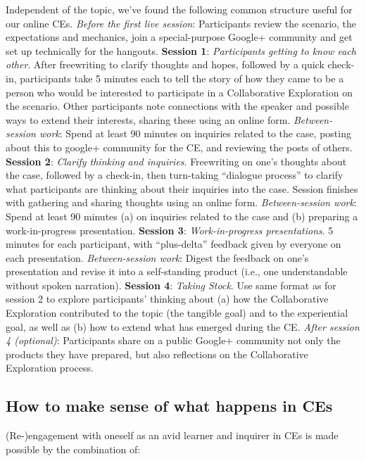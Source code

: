 Independent of the topic, we've found the following common structure
useful for our online CEs. \emph{Before the first live session}:
Participants review the scenario, the expectations and mechanics, join a
special-purpose Google+ community and get set up technically for the
hangouts. \textbf{Session 1}: \emph{Participants getting to know each
other}. After freewriting to clarify thoughts and hopes, followed by a
quick check-in, participants take 5 minutes each to tell the story of
how they came to be a person who would be interested to participate in a
Collaborative Exploration on the scenario. Other participants note
connections with the speaker and possible ways to extend their
interests, sharing these using an online form. \emph{Between-session
work}: Spend at least 90 minutes on inquiries related to the case,
posting about this to google+ community for the CE, and reviewing the
posts of others. \textbf{Session 2}: \emph{Clarify thinking and
inquiries}. Freewriting on one's thoughts about the case, followed by a
check-in, then turn-taking ``dialogue process'' to clarify what
participants are thinking about their inquiries into the case. Session
finishes with gathering and sharing thoughts using an online form.
\emph{Between-session work}: Spend at least 90 minutes (a) on inquiries
related to the case and (b) preparing a work-in-progress presentation.
\textbf{Session 3}: \emph{Work-in-progress presentations}. 5 minutes for
each participant, with ``plus-delta'' feedback given by everyone on each
presentation. \emph{Between-session work}: Digest the feedback on one's
presentation and revise it into a self-standing product (i.e., one
understandable without spoken narration). \textbf{Session 4}:
\emph{Taking Stock}. Use same format as for session 2 to explore
participants' thinking about (a) how the Collaborative Exploration
contributed to the topic (the tangible goal) and to the experiential
goal, as well as (b) how to extend what has emerged during the CE.
\emph{After session 4 (optional)}: Participants share on a public
Google+ community not only the products they have prepared, but also
reflections on the Collaborative Exploration process.

\subsection{How to make sense of what happens in CEs}

(Re-)engagement with oneself as an avid learner and inquirer in CEs is
made possible by the combination of:

